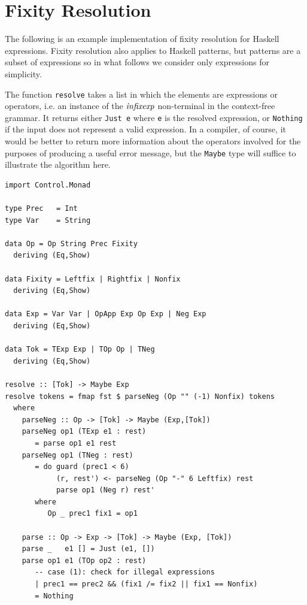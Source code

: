 \section{Fixity Resolution}
\label{fixity-resolution}

\begin{haskellprime}

The following is an example implementation of fixity resolution for
Haskell expressions.  Fixity resolution also applies to Haskell
patterns, but patterns are a subset of expressions so in what follows
we consider only expressions for simplicity.

The function \mbox{\tt resolve} takes a list in which the elements are
expressions or operators, i.e. an instance of the \mbox{$\it infixexp$}
non-terminal in the context-free grammar.  It returns either \mbox{\tt Just\ e}
where \mbox{\tt e} is the resolved expression, or \mbox{\tt Nothing} if the input does
not represent a valid expression.  In a compiler, of course, it would
be better to return more information about the operators involved for
the purposes of producing a useful error message, but the \mbox{\tt Maybe} type
will suffice to illustrate the algorithm here.

\bprog
{\small\begin{verbatim}
import Control.Monad

type Prec   = Int
type Var    = String

data Op = Op String Prec Fixity
  deriving (Eq,Show)

data Fixity = Leftfix | Rightfix | Nonfix
  deriving (Eq,Show)

data Exp = Var Var | OpApp Exp Op Exp | Neg Exp 
  deriving (Eq,Show)

data Tok = TExp Exp | TOp Op | TNeg
  deriving (Eq,Show)
   
resolve :: [Tok] -> Maybe Exp
resolve tokens = fmap fst $ parseNeg (Op "" (-1) Nonfix) tokens
  where
    parseNeg :: Op -> [Tok] -> Maybe (Exp,[Tok])
    parseNeg op1 (TExp e1 : rest)
       = parse op1 e1 rest
    parseNeg op1 (TNeg : rest)
       = do guard (prec1 < 6)
            (r, rest') <- parseNeg (Op "-" 6 Leftfix) rest
            parse op1 (Neg r) rest'
       where
          Op _ prec1 fix1 = op1

    parse :: Op -> Exp -> [Tok] -> Maybe (Exp, [Tok])
    parse _   e1 [] = Just (e1, [])
    parse op1 e1 (TOp op2 : rest) 
       -- case (1): check for illegal expressions
       | prec1 == prec2 && (fix1 /= fix2 || fix1 == Nonfix)
       = Nothing


\end{verbatim}}
\end{haskellprime}
